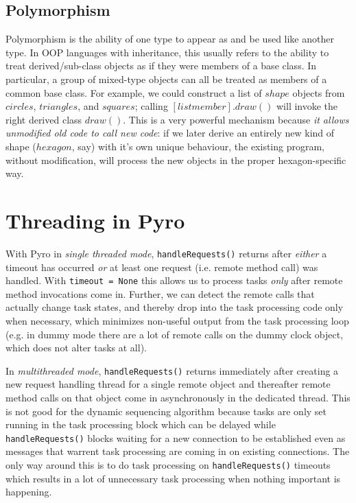 \documentclass[11pt,a4paper]{article}
\begin{document}
\subsection{Polymorphism}

Polymorphism is the ability of one type to appear as and be used like
another type.  In OOP languages with inheritance, this usually refers to
the ability to treat derived/sub-class objects as if they were members
of a base class.  In particular, a group of mixed-type objects can all
be treated as members of a common base class. For example, we could
construct a list of $shape$ objects from $circles$, $triangles$, and
$squares$; calling $[list member].draw()$ will invoke the right derived
class $draw()$. This is a very powerful mechanism because {\em it allows
unmodified old code to call new code}: if we later derive an entirely
new kind of shape ($hexagon$, say) with it's own unique behaviour, the
existing program, without modification, will process the new objects in
the proper hexagon-specific way.


\section{Threading in Pyro} \label{pyro-appendix}

With Pyro in {\em single threaded mode}, \verb#handleRequests()# returns
after {\em either} a timeout has occurred {\em or} at least one request
(i.e.  remote method call) was handled. With \verb#timeout = None# this
allows us to process tasks {\em only} after remote method invocations
come in.  Further, we can detect the remote calls that actually change
task states, and thereby drop into the task processing code only when
necessary, which minimizes non-useful output from the task processing
loop (e.g. in dummy mode there are a lot of remote calls on the dummy
clock object, which does not alter tasks at all). 

In {\em multithreaded mode}, \verb#handleRequests()# returns immediately
after creating a new request handling thread for a single remote object
and thereafter remote method calls on that object come in asynchronously
in the dedicated thread. This is not good for the dynamic sequencing
algorithm because tasks are only set running in the task processing
block which can be delayed while \verb#handleRequests()# blocks waiting
for a new connection to be established even as messages that warrent
task processing are coming in on existing connections. The only way
around this is to do task processing on \verb#handleRequests()# timeouts
which results in a lot of unnecessary task processing when nothing
important is happening.
\end{document}

